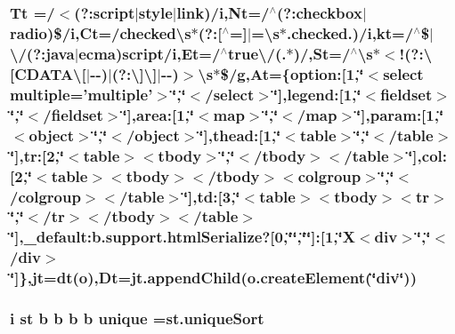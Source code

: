 \hypertarget{jquery-1_89_81_8min_8js_a07f00b8562506c70b88951d86ea272d8}{
\subsubsection[{Tt}]{\setlength{\rightskip}{0pt plus 5cm}Tt =/$<$(?\-:script$\vert$style$\vert$link)/{\bf i},Nt=/$^\wedge$(?\-:checkbox$\vert$radio)\$/{\bf i},Ct=/{\bf checked\textbackslash{}s}$\ast$(?\-:\mbox{[}$^\wedge$=\mbox{]}$\vert$=\textbackslash{}{\bf s}$\ast$.checked.)/{\bf i},kt=/$^\wedge$\$$\vert$\textbackslash{}/(?\-:java$\vert$ecma)script/{\bf i},Et=/$^\wedge$true\textbackslash{}/(.$\ast$)/,St=/$^\wedge$\textbackslash{}{\bf s}$\ast$$<$!(?\-:\textbackslash{}\mbox{[}C\-D\-A\-T\-A\textbackslash{}\mbox{[}$\vert$-\/-\/)$\vert$(?\-:\textbackslash{}\mbox{]}\textbackslash{}\mbox{]}$\vert$-\/-\/)$>$\textbackslash{}{\bf s}$\ast$\$/{\bf g},At=\{option\-:\mbox{[}1,\char`\"{}$<$select multiple='multiple'$>$\char`\"{},\char`\"{}$<$/select$>$\char`\"{}\mbox{]},legend\-:\mbox{[}1,\char`\"{}$<$fieldset$>$\char`\"{},\char`\"{}$<$/fieldset$>$\char`\"{}\mbox{]},area\-:\mbox{[}1,\char`\"{}$<$map$>$\char`\"{},\char`\"{}$<$/map$>$\char`\"{}\mbox{]},param\-:\mbox{[}1,\char`\"{}$<$object$>$\char`\"{},\char`\"{}$<$/object$>$\char`\"{}\mbox{]},thead\-:\mbox{[}1,\char`\"{}$<$table$>$\char`\"{},\char`\"{}$<$/table$>$\char`\"{}\mbox{]},tr\-:\mbox{[}2,\char`\"{}$<$table$>$$<${\bf tbody}$>$\char`\"{},\char`\"{}$<$/{\bf tbody}$>$$<$/table$>$\char`\"{}\mbox{]},col\-:\mbox{[}2,\char`\"{}$<$table$>$$<${\bf tbody}$>$$<$/{\bf tbody}$>$$<$colgroup$>$\char`\"{},\char`\"{}$<$/colgroup$>$$<$/table$>$\char`\"{}\mbox{]},td\-:\mbox{[}3,\char`\"{}$<$table$>$$<${\bf tbody}$>$$<$tr$>$\char`\"{},\char`\"{}$<$/tr$>$$<$/{\bf tbody}$>$$<$/table$>$\char`\"{}\mbox{]},\-\_\-default\-:b.\-support.\-html\-Serialize?\mbox{[}0,\char`\"{}\char`\"{},\char`\"{}\char`\"{}\mbox{]}\-:\mbox{[}1,\char`\"{}X$<$div$>$\char`\"{},\char`\"{}$<$/div$>$\char`\"{}\mbox{]}\},jt={\bf dt}({\bf o}),Dt=jt.\-append\-Child(o.\-create\-Element(\char`\"{}div\char`\"{}))}}\label{jquery-1_89_81_8min_8js_a07f00b8562506c70b88951d86ea272d8}
\hypertarget{jquery-1_89_81_8min_8js_a8ac9d5c1e90c48e6dd7efb7db22f1093}{
\subsubsection[{unique}]{ {\bf i} {\bf st} {\bf b} {\bf b} {\bf b} {\bf b} unique =st.\-unique\-Sort}}\label{jquery-1_89_81_8min_8js_a8ac9d5c1e90c48e6dd7efb7db22f1093}
